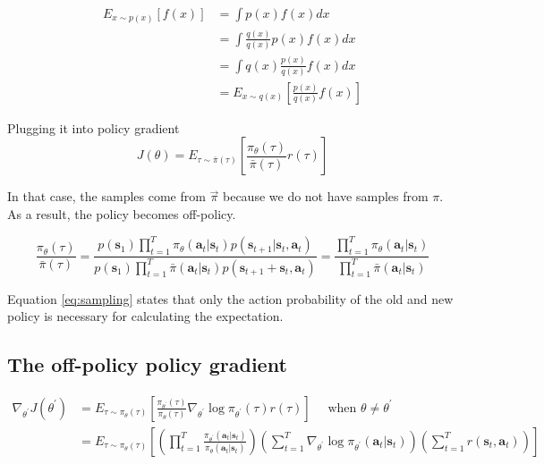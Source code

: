 \documentclass[]{article}
\begin{document}
\begin{equation}\begin{aligned}
E_{x \sim p(x)}[f(x)] &=\int p(x) f(x) d x \\
&=\int \frac{q(x)}{q(x)} p(x) f(x) d x \\
&=\int q(x) \frac{p(x)}{q(x)} f(x) d x \\
&=E_{x \sim q(x)}\left[\frac{p(x)}{q(x)} f(x)\right]
\end{aligned}\end{equation}

Plugging it into policy gradient
\begin{equation}J(\theta)=E_{\tau \sim \bar{\pi}(\tau)}\left[\frac{\pi_{\theta}(\tau)}{\bar{\pi}(\tau)} r(\tau)\right]\end{equation}

\par In that case, the samples come from $\vec{\pi}$ because we do not have samples from $\pi.$ As a result, the
policy becomes off-policy.

\begin{equation}
    \label{eq:sampling}
    \frac{\pi_{\theta}(\tau)}{\bar{\pi}(\tau)}=\frac{p\left(\mathbf{s}_{1}\right) \prod_{t=1}^{T}
\pi_{\theta}\left(\mathbf{a}_{t} | \mathbf{s}_{t}\right) p\left(\mathbf{s}_{t+1} | \mathbf{s}_{t},
\mathbf{a}_{t}\right)}{p\left(\mathbf{s}_{1}\right) \prod_{t=1}^{T} \bar{\pi}\left(\mathbf{a}_{t} | \mathbf{s}_{t}\right) p\left(\mathbf{s}_{t+1}+\mathbf{s}_{t}, \mathbf{a}_{t}\right)}=\frac{\prod_{t=1}^{T} \pi_{\theta}\left(\mathbf{a}_{t} | \mathbf{s}_{t}\right)}{\prod_{t=1}^{T} \bar{\pi}\left(\mathbf{a}_{t} | \mathbf{s}_{t}\right)}
\end{equation}

\par Equation \eqref{eq:sampling} states that only the action probability of the old and new policy is necessary for
calculating the expectation. 

\subsection*{The off-policy policy gradient}%
\label{sub:The off-policy  gradient}


\begin{equation*}\begin{aligned}
\nabla_{\theta^{\prime}} J\left(\theta^{\prime}\right) &=E_{\tau \sim \pi_{\theta}(\tau)}\left[\frac{\pi_{\theta^{\prime}}(\tau)}{\pi_{\theta}(\tau)} \nabla_{\theta^{\prime}} \log \pi_{\theta^{\prime}}(\tau) r(\tau)\right] \quad \text { when } \theta \neq \theta^{\prime} \\
&=E_{\tau \sim \pi_{\theta}(\tau)}\left[\left(\prod_{t=1}^{T} \frac{\pi_{\theta^{\prime}}\left(\mathbf{a}_{t} | \mathbf{s}_{t}\right)}{\pi_{\theta}\left(\mathbf{a}_{t} | \mathbf{s}_{t}\right)}\right)\left(\sum_{t=1}^{T} \nabla_{\theta^{\prime}} \log \pi_{\theta^{\prime}}\left(\mathbf{a}_{t} | \mathbf{s}_{t}\right)\right)\left(\sum_{t=1}^{T} r\left(\mathbf{s}_{t}, \mathbf{a}_{t}\right)\right)\right]
\end{aligned}\end{equation*}
\end{document}
